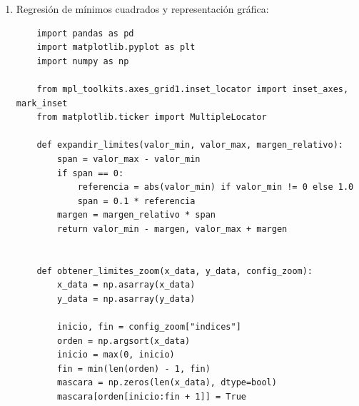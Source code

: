\documentclass[11pt]{report}
\begin{document}
\begin{enumerate}
\begin{verbatim}
    df = pd.read_csv(r"c:\Users\sorry\Downloads\Programación\Python\tabla4mod.csv")

    log_f=np.log10(df["f"])
    z=df["logz"]
    z_err=df["dlogz"]

    x1=np.linspace(min(df["f"]),max(df["f"]),1000)
    x2=np.log10(x1)
    zt=20*np.log10(np.sqrt(10**8+(1/(2*np.pi*12*10**(-9)*x1))**2))
    ztt=np.linspace(min(df["f"]),max(df["f"]),1000)

    plt.errorbar(log_f, z, yerr=z_err, fmt='o', capsize=3, color='blue',label="datos")
    plt.xlabel('$\log f \ (-)$')
    plt.ylabel('$20\log Z \ (-)$')
    plt.title('Curvas de la impedancia $Z$ frente a la frecuencia $\log f$')
    plt.grid(True)

    plt.scatter(x=np.log10(1326.29),y=80,color='gold',label='Pto de corte de R y C')
    plt.scatter(x=np.log10(1326.29),y=20*np.log10(np.sqrt(10000**2 + (1/(2*np.pi*12e-9*1326.29))**2)),
    color='aqua',label='Impedancia teórica en $f_c$')
    plt.axvline(x=np.log10(1326.29),linestyle='--',color='darkorange',label="Frecuencia de corte")
    plt.plot(x2,zt,color='fuchsia',label="Curva RC")
    plt.axhline(y=20*np.log10(10000),color='r',label="Curva R")
    plt.plot(np.log10(ztt),20*np.log10(1/(2*np.pi*12*ztt*10**(-9))),color='springgreen',label="Curva C")
    plt.legend()
    plt.show()
\end{verbatim}
\bigskip
\item Regresión de mínimos cuadrados y representación gráfica:
\bigskip
\begin{verbatim}
    import pandas as pd
    import matplotlib.pyplot as plt
    import numpy as np

    from mpl_toolkits.axes_grid1.inset_locator import inset_axes, mark_inset
    from matplotlib.ticker import MultipleLocator

    def expandir_limites(valor_min, valor_max, margen_relativo):
        span = valor_max - valor_min
        if span == 0:
            referencia = abs(valor_min) if valor_min != 0 else 1.0
            span = 0.1 * referencia
        margen = margen_relativo * span
        return valor_min - margen, valor_max + margen


    def obtener_limites_zoom(x_data, y_data, config_zoom):
        x_data = np.asarray(x_data)
        y_data = np.asarray(y_data)

        inicio, fin = config_zoom["indices"]
        orden = np.argsort(x_data)
        inicio = max(0, inicio)
        fin = min(len(orden) - 1, fin)
        mascara = np.zeros(len(x_data), dtype=bool)
        mascara[orden[inicio:fin + 1]] = True


\end{verbatim}
\end{enumerate}
\end{document}
